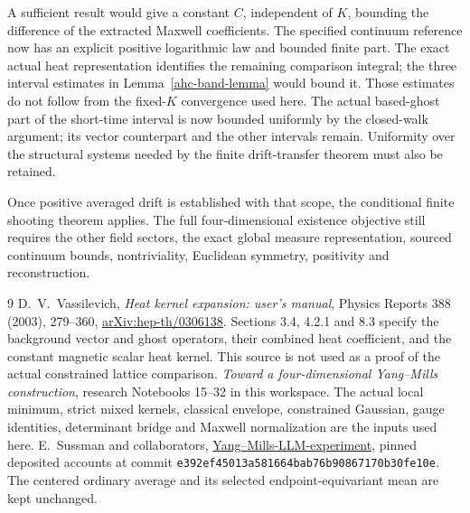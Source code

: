 \documentclass[11pt]{article}
\theoremstyle{remark}
\begin{document}
A sufficient result would give a constant \(C\), independent
of \(K\), bounding the difference of the extracted
Maxwell coefficients. The specified continuum reference
now has an explicit positive logarithmic law and bounded
finite part. The exact actual heat representation identifies
the remaining comparison integral; the three interval
estimates in Lemma~\ref{ahc-band-lemma} would bound it.
Those estimates do not follow from the fixed-\(K\)
convergence used here. The actual based-ghost part of
the short-time interval is now bounded uniformly by
the closed-walk argument; its vector counterpart and
the other intervals remain. Uniformity over
the structural systems needed by the finite drift-transfer
theorem must also be retained.

Once positive averaged drift is established with that
scope, the conditional finite shooting theorem applies.
The full four-dimensional existence objective still
requires the other field sectors, the exact global
measure representation, sourced continuum bounds,
nontriviality, Euclidean symmetry, positivity and
reconstruction.

\begin{thebibliography}{9}
D.~V.~Vassilevich,
\emph{Heat kernel expansion: user's manual},
Physics Reports 388 (2003), 279--360,
\href{https://arxiv.org/abs/hep-th/0306138}{arXiv:hep-th/0306138}.
Sections 3.4, 4.2.1 and 8.3 specify the background vector
and ghost operators, their combined heat coefficient,
and the constant magnetic scalar heat kernel.
This source is not used as a proof of the actual constrained
lattice comparison.
\emph{Toward a four-dimensional Yang--Mills construction},
research Notebooks 15--32 in this workspace.
The actual local minimum, strict mixed kernels, classical
envelope, constrained Gaussian, gauge identities, determinant
bridge and Maxwell normalization are the inputs used here.
E.~Sussman and collaborators,
\href{https://github.com/ethanwsussman/Yang--Mills-LLM-experiment}
{Yang--Mills-LLM-experiment}, pinned deposited accounts at
commit \texttt{e392ef4501\allowbreak 3a581664ba\allowbreak b76b908671\allowbreak 70b30fe10e}.
The centered ordinary average and its selected
endpoint-equivariant mean are kept unchanged.
\end{thebibliography}
\end{document}

